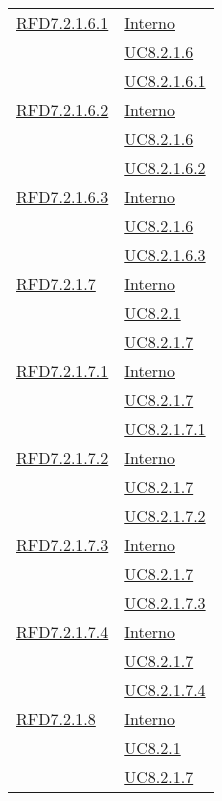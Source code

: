 \begin{longtable}{|>{\centering}m{5cm}|m{5cm}<{\centering}|}
\hyperlink{RFD7.2.1.6.1}{RFD7.2.1.6.1} & \hyperlink{Interno}{Interno}\\
& \hyperref[UC8.2.1.6]{UC8.2.1.6}\\
& \hyperref[UC8.2.1.6.1]{UC8.2.1.6.1}\\ \hline

\hyperlink{RFD7.2.1.6.2}{RFD7.2.1.6.2} & \hyperlink{Interno}{Interno}\\
& \hyperref[UC8.2.1.6]{UC8.2.1.6}\\
& \hyperref[UC8.2.1.6.2]{UC8.2.1.6.2}\\ \hline

\hyperlink{RFD7.2.1.6.3}{RFD7.2.1.6.3} & \hyperlink{Interno}{Interno}\\
& \hyperref[UC8.2.1.6]{UC8.2.1.6}\\
& \hyperref[UC8.2.1.6.3]{UC8.2.1.6.3}\\ \hline

\hyperlink{RFD7.2.1.7}{RFD7.2.1.7} & \hyperlink{Interno}{Interno}\\
& \hyperref[UC8.2.1]{UC8.2.1}\\
& \hyperref[UC8.2.1.7]{UC8.2.1.7}\\ \hline

\hyperlink{RFD7.2.1.7.1}{RFD7.2.1.7.1} & \hyperlink{Interno}{Interno}\\
& \hyperref[UC8.2.1.7]{UC8.2.1.7}\\
& \hyperref[UC8.2.1.7.1]{UC8.2.1.7.1}\\ \hline

\hyperlink{RFD7.2.1.7.2}{RFD7.2.1.7.2} & \hyperlink{Interno}{Interno}\\
& \hyperref[UC8.2.1.7]{UC8.2.1.7}\\
& \hyperref[UC8.2.1.7.2]{UC8.2.1.7.2}\\ \hline

\hyperlink{RFD7.2.1.7.3}{RFD7.2.1.7.3} & \hyperlink{Interno}{Interno}\\
& \hyperref[UC8.2.1.7]{UC8.2.1.7}\\
& \hyperref[UC8.2.1.7.3]{UC8.2.1.7.3}\\ \hline

\hyperlink{RFD7.2.1.7.4}{RFD7.2.1.7.4} & \hyperlink{Interno}{Interno}\\
& \hyperref[UC8.2.1.7]{UC8.2.1.7}\\
& \hyperref[UC8.2.1.7.4]{UC8.2.1.7.4}\\ \hline

\hyperlink{RFD7.2.1.8}{RFD7.2.1.8} & \hyperlink{Interno}{Interno}\\
& \hyperref[UC8.2.1]{UC8.2.1}\\
& \hyperref[UC8.2.1.7]{UC8.2.1.7}\\ \hline


\end{longtable}
